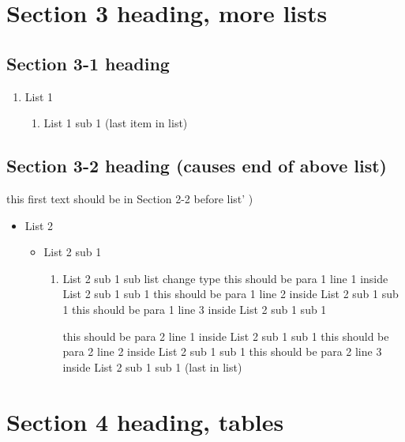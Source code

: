 \documentclass[11pt]{article}
\begin{document}
\section{Section 3 heading, more lists  }
 \label{obj-205}
 \label{obj-204}
\subsection{Section 3-1 heading  }
 \label{obj-208}
 \label{obj-207}
\begin{enumerate}
\item
List 1
\begin{enumerate}
\item
List 1 sub 1 (last item in list)
\end{enumerate}
\end{enumerate}
\subsection{Section 3-2 heading (causes end of above list)  }
 \label{obj-217}
 \label{obj-216}
this first text should be in Section 2-2 before list' )

\begin{itemize}
\item
List 2
\begin{itemize}
\item
List 2 sub 1
\begin{enumerate}
\item
List 2 sub 1 sub list change type
      this should be para 1 line 1 inside List 2 sub 1 sub 1
      this should be para 1 line 2 inside List 2 sub 1 sub 1
      this should be para 1 line 3 inside List 2 sub 1 sub 1

\vspace{\baselineskip}
      this should be para 2 line 1 inside List 2 sub 1 sub 1
      this should be para 2 line 2 inside List 2 sub 1 sub 1
      this should be para 2 line 3 inside List 2 sub 1 sub 1 (last in list)
\vspace{\baselineskip}

\end{enumerate}
\end{itemize}
\end{itemize}
\section{Section 4 heading, tables  }
 \label{obj-241}
 \label{obj-240}
\end{document}
